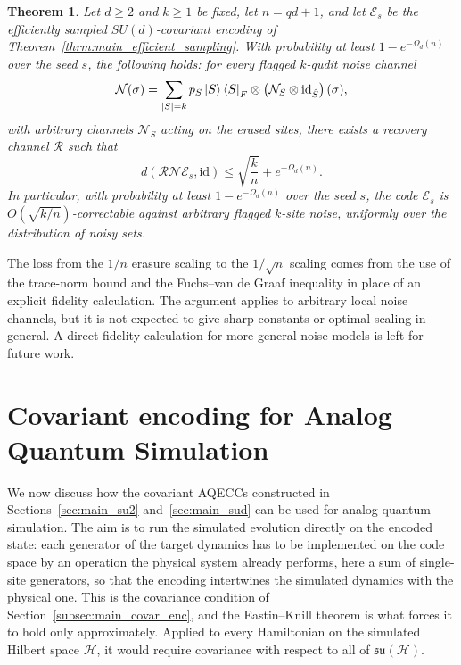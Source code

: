 \documentclass[10pt,twocolumn,superscriptaddress,aps,amsmath,amssymb,citeautoscript,floatfix,prx]{revtex4-2}
\newtheorem{theorem}{Theorem}
\theoremstyle{plain}
\theoremstyle{plain}
\theoremstyle{plain}
\theoremstyle{plain}
\theoremstyle{plain}
\theoremstyle{plain}
\theoremstyle{plain}
\theoremstyle{definition}
\theoremstyle{plain}
\begin{document}
\begin{theorem}\label{thrm:main_k_arb_scale}
Let $d\ge2$ and $k\ge1$ be fixed, let $n=qd+1$, and let $\mathcal E_s$ be the efficiently sampled $SU(d)$-covariant encoding of Theorem~\ref{thrm:main_efficient_sampling}. 
With probability at least $1-e^{-\Omega_d(n)}$ over the seed $s$, the following holds: for every flagged $k$-qudit noise channel
$$
\mathcal N(\sigma)
=
\sum_{|S|=k}
p_S
\ket S\bra S_F
\otimes
\left(
\mathcal N_S\otimes\mathrm{id}_{\hat S}
\right)(\sigma),
$$
with arbitrary channels $\mathcal N_S$ acting on the erased sites, there exists a recovery channel $\mathcal R$ such that
$$
d(\mathcal R\mathcal N\mathcal E_s,\mathrm{id})
\le
\sqrt{\frac kn}
+
e^{-\Omega_d(n)} .
$$
In particular, with probability at least $1-e^{-\Omega_d(n)}$ over the seed $s$, 
the code $\mathcal E_s$ is $O(\sqrt{k/n})$-correctable against arbitrary flagged $k$-site noise, uniformly over the distribution of noisy sets.
\end{theorem}

The loss from the $1/n$ erasure scaling to the $1/\sqrt n$ scaling comes from the use of the trace-norm bound and the Fuchs--van de Graaf inequality 
in place of an explicit fidelity calculation. The argument applies to arbitrary local noise channels, but it is not expected to give sharp constants or optimal scaling in general. 
A direct fidelity calculation for more general noise models is left for future work.


\section{Covariant encoding for Analog Quantum Simulation}\label{sec:main_covar_analog}

We now discuss how the covariant AQECCs constructed in Sections~\ref{sec:main_su2} and~\ref{sec:main_sud} can be used for analog quantum simulation. 
The aim is to run the simulated evolution directly on the encoded state: 
each generator of the target dynamics has to be implemented on the code space by an operation the physical system already performs, 
here a sum of single-site generators, so that the encoding intertwines the simulated dynamics with the physical one. 
This is the covariance condition of Section~\ref{subsec:main_covar_enc}, and the Eastin--Knill theorem is what forces it to hold only approximately. 
Applied to every Hamiltonian on the simulated Hilbert space $\mathcal H$, it would require covariance with respect to all of $\mathfrak{su}(\mathcal H)$.
\end{document}
